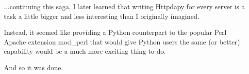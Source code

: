 ...continuing this saga, I later learned that writing Httpdapy for
every server is a task a little bigger and less interesting than I
originally imagined.

Instead, it seemed like providing a Python counterpart to the popular
Perl Apache extension mod_perl that would give Python users the same
(or better) capability would be a much more exciting thing to do.

And so it was done. 

